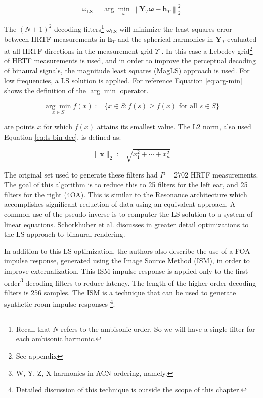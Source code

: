 \begin{equation}
\omega_{\mathrm{LS}}=\arg \min _{\omega}\left\|\boldsymbol{Y}_{\Upsilon} \boldsymbol{\omega}-\boldsymbol{h}_{\Upsilon}\right\|_{2}^{2}
\label{eq:ls-bin-dec}
\end{equation}

The $(N+1)^2$ decoding filters\footnote{Recall that $N$ refers to the ambisonic order. So we will have a single filter for each ambisonic harmonic.} $\omega_{\mathrm{LS}}$ will minimize the least squares error between HRTF measurements in $\boldsymbol{h}_{\Upsilon}$ and the spherical harmonics in $\boldsymbol{Y}_{\Upsilon}$ evaluated at all HRTF directions in the measurement grid $\Upsilon$ \cite{deppisch2020hoast}. In this case a Lebedev grid\footnote{See appendix} of HRTF measurements is used, and in order to improve the perceptual decoding of binaural signals, the magnitude least squares (MagLS) approach is used. For low frequencies, a LS solution is applied. For reference Equation \ref{eq:arg-min} shows the definition of the $\arg \min$ operator. 

\begin{equation}
\underset{x \in S}{\arg \min } f(x):=\{x \in S: f(s) \geq f(x) \text { for all } s \in S\}
\label{eq:arg-min}
\end{equation}

are points $x$ for which $f(x)$ attains its smallest value. The L2 norm, also used Equation \ref{eq:ls-bin-dec}, is defined as:

\begin{equation}
\|\boldsymbol{x}\|_{2}:=\sqrt{x_{1}^{2}+\cdots+x_{n}^{2}}
\end{equation}

The original set used to generate these filters had $P=2702$ HRTF measurements. The goal of this algorithm is to reduce this to 25 filters for the left ear, and 25 filters for the right (4OA). This is similar to the Resonance architecture \cite{gorzel2019efficient} which accomplishes significant reduction of data using an equivalent approach. A common use of the pseudo-inverse is to computer the LS solution to a system of linear equations. Schorkhuber et al. \cite{schorkhuber2018binaural} discusses in greater detail optimizations to the LS approach to binaural rendering. 

In addition to this LS optimization, the authors also describe the use of a FOA impulse response, generated using the Image Source Method (ISM), in order to improve externalization. This ISM impulse response is applied only to the first-order\footnote{W, Y, Z, X harmonics in ACN ordering, namely.} decoding filters to reduce latency. The length of the higher-order decoding filters is 256 samples. The ISM is a technique that can be used to generate synthetic room impulse responses \cite{allen1979image}\footnote{Detailed discussion of this technique is outside the scope of this chapter.}. 

